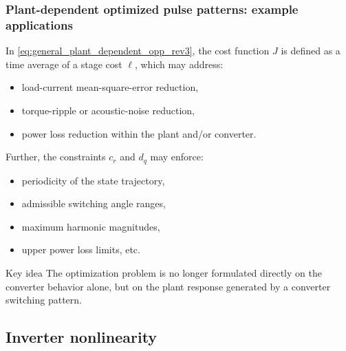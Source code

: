 \begin{frame}
    \frametitle{Plant-dependent optimized pulse patterns: example applications}
    In \eqref{eq:general_plant_dependent_opp_rev3}, the cost function \(J\) is defined as a time average of a stage cost \(\ell\), which may address:
    \begin{itemize}
        \item load-current mean-square-error reduction,\pause
        \item torque-ripple or acoustic-noise reduction,\pause
        \item power loss reduction within the plant and/or converter.
    \end{itemize}\pause
    Further, the constraints \(c_r\) and \(d_q\) may enforce:
    \begin{itemize}
        \item periodicity of the state trajectory,\pause
        \item admissible switching angle ranges,\pause
        \item maximum harmonic magnitudes,\pause
        \item upper power loss limits, etc.
    \end{itemize}\pause
    \begin{varblock}{Key idea}
        The optimization problem is no longer formulated directly on the converter behavior alone, but on the plant response generated by a converter switching pattern.
    \end{varblock}
\end{frame}


\subsection{Inverter nonlinearity}

